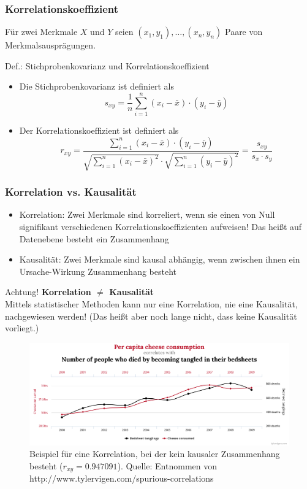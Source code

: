\begin{frame}
\frametitle{Korrelationskoeffizient}
Für zwei Merkmale $X$ und $Y$ seien $(x_1,y_1),\ldots,(x_n,y_n)$ Paare von Merkmalsausprägungen.
\begin{block}{Def.: Stichprobenkovarianz und Korrelationskoeffizient}
\begin{itemize}
\pause
\item Die Stichprobenkovarianz ist definiert als
\[
s_{xy} = \frac{1}{n}\sum\limits_{i=1}^n (x_i-\bar{x})\cdot(y_i-\bar{y})
\]
\pause
\item Der Korrelationskoeffizient ist definiert als
\[
r_{xy} = \frac{\sum\limits_{i=1}^n (x_i-\bar{x})\cdot(y_i-\bar{y})}{\sqrt{\sum\limits_{i=1}^n (x_i-\bar{x})^2}\cdot \sqrt{\sum\limits_{i=1}^n (y_i-\bar{y})^2}} = \frac{s_{xy}}{s_x\cdot s_y}
\]
\end{itemize}
\end{block}
\end{frame}

\begin{frame}
\frametitle{Korrelation vs. Kausalität}
\begin{itemize}[<+->]
\item Korrelation: Zwei Merkmale sind korreliert, wenn sie einen von Null signifikant verschiedenen Korrelationskoeffizienten aufweisen! Das heißt auf Datenebene besteht ein Zusammenhang
\item Kausalität: Zwei Merkmale sind kausal abhängig, wenn zwischen ihnen ein Ursache-Wirkung Zusammenhang besteht
\end{itemize}
\pause
\begin{block}{Achtung!}
\textbf{Korrelation $\neq$ Kausalität}\\
Mittels statistischer Methoden kann nur eine Korrelation, nie eine Kausalität, nachgewiesen werden! (Das heißt aber noch lange nicht, dass keine Kausalität vorliegt.)
\end{block}
\end{frame}

\begin{frame}
\begin{figure}[hbtp]
\centering
\includegraphics[scale=0.2]{images/chart-korrelation.png}
\caption{Beispiel für eine Korrelation, bei der kein kausaler Zusammenhang besteht ($r_{xy} = 0.947091$). Quelle: Entnommen von http://www.tylervigen.com/spurious-correlations}
\end{figure}
\end{frame}

